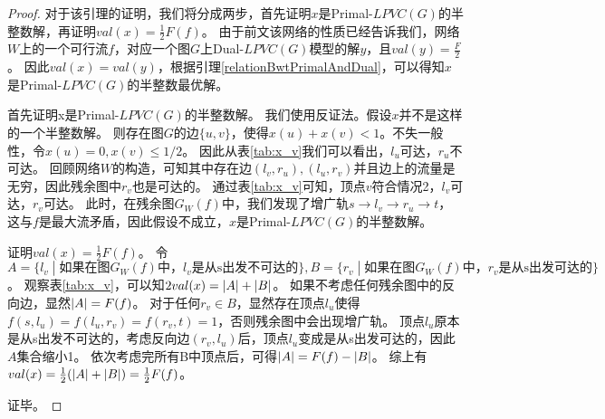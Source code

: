 \begin{proof}
对于该引理的证明，我们将分成两步，首先证明$x$是Primal-$LPVC(G)$的半整数解，再证明$val(x) = \frac{1}{2}F(f)$。
由于前文该网络的性质已经告诉我们，网络$W$上的一个可行流$f$，对应一个图$G$上Dual-$LPVC(G)$模型的解$y$，且$val(y) = \frac{F}{2}$。
因此$val(x) = val(y)$，根据引理\ref{relationBwtPrimalAndDual}，可以得知$x$是Primal-$LPVC(G)$的半整数最优解。

首先证明x是Primal-$LPVC(G)$的半整数解。
我们使用反证法。假设$x$并不是这样的一个半整数解。
则存在图$G$的边$\{u, v\}$，使得$x(u) + x(v) < 1$。不失一般性，令$x(u) = 0, x(v) \le 1/2$。
因此从表\ref{tab:x_v}我们可以看出，$l_u$可达，$r_u$不可达。
回顾网络$W$的构造，可知其中存在边$(l_v, r_u), (l_u, r_v)$并且边上的流量是无穷，因此残余图中$r_v$也是可达的。
通过表\ref{tab:x_v}可知，顶点$v$符合情况2，$l_v$可达，$r_v$可达。
此时，在残余图$G_W(f)$中，我们发现了增广轨$s \rightarrow l_v \rightarrow r_u \rightarrow t$，这与$f$是最大流矛盾，因此假设不成立，$x$是Primal-$LPVC(G)$的半整数解。

证明$val(x) = \frac{1}{2}F(f)$。
令$A = \{l_v\;|\;\text{如果在图$G_W(f)$中，$l_v$是从s出发不可达的}\}, B = \{r_v\;|\;\text{如果在图$G_W(f)$中，$r_v$是从s出发可达的}\}$。
观察表\ref{tab:x_v}，可以知$2val(x) = \left\vert A \right\vert + \left\vert B \right\vert$。
如果不考虑任何残余图中的反向边，显然$\left\vert A \right\vert = F(f)$。
对于任何$r_v \in B$，显然存在顶点$l_u$使得$f(s, l_u) = f(l_u, r_v) = f(r_v, t) = 1$，否则残余图中会出现增广轨。
顶点$l_u$原本是从s出发不可达的，考虑反向边$(r_v, l_u)$后，顶点$l_u$变成是从s出发可达的，因此$A$集合缩小1。
依次考虑完所有B中顶点后，可得$\left\vert A \right\vert = F(f) - \left\vert B \right\vert$。
综上有$val(x) = \frac{1}{2}(\left\vert A \right\vert + \left\vert B \right\vert) = \frac{1}{2}F(f)$。

证毕。
\end{proof}


